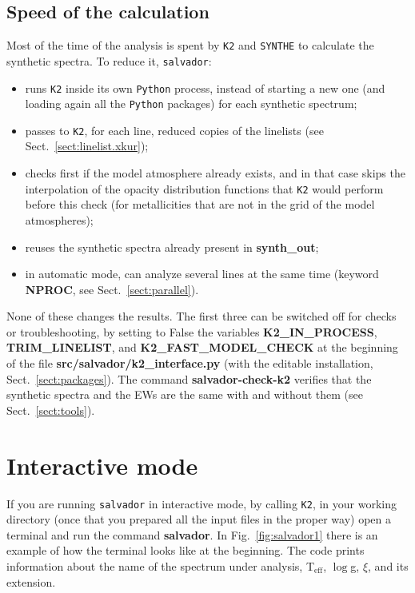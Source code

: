 \documentclass[modern]{aastex701}
\begin{document}
\subsection{Speed of the calculation} \label{sect:speed}
Most of the time of the analysis is spent by \texttt{K2} and \texttt{SYNTHE} to calculate the synthetic spectra. To reduce it, \texttt{salvador}:
\begin{itemize}
    \item runs \texttt{K2} inside its own \texttt{Python} process, instead of starting a new one (and loading again all the \texttt{Python} packages) for each synthetic spectrum;
    \item passes to \texttt{K2}, for each line, reduced copies of the linelists (see Sect.~\ref{sect:linelist.xkur});
    \item checks first if the model atmosphere already exists, and in that case skips the interpolation of the opacity distribution functions that \texttt{K2} would perform before this check (for metallicities that are not in the grid of the model atmospheres);
    \item reuses the synthetic spectra already present in {\bf synth\_out};
    \item in automatic mode, can analyze several lines at the same time (keyword {\bf NPROC}, see Sect.~\ref{sect:parallel}).
\end{itemize}
None of these changes the results. The first three can be switched off for checks or troubleshooting, by setting to False the variables {\bf K2\_IN\_PROCESS}, {\bf TRIM\_LINELIST}, and {\bf K2\_FAST\_MODEL\_CHECK} at the beginning of the file {\bf src/salvador/k2\_interface.py} (with the editable installation, Sect.~\ref{sect:packages}). The command {\bf salvador-check-k2} verifies that the synthetic spectra and the EWs are the same with and without them (see Sect.~\ref{sect:tools}).

\section{Interactive mode} \label{sect:interactive}
If you are running \texttt{salvador} in interactive mode, by calling \texttt{K2}, in your working directory (once that you prepared all the input files in the proper way) open a terminal and run the command {\bf salvador}. In Fig.~\ref{fig:salvador1} there is an example of how the terminal looks like at the beginning. The code prints information about the name of the spectrum under analysis, T$_{\mathrm{eff}}$, $\log$g, $\xi$, and its extension. 
\end{document}
